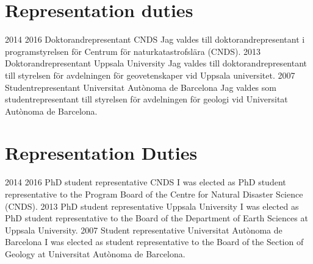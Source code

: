 \ifswedish
    \section{Representation duties}
    \position
        {2014 \textemdash{} 2016}
        {Doktorandrepresentant}
        {CNDS}
        {Jag valdes till doktorandrepresentant i programstyrelsen för Centrum för naturkatastrofslära (CNDS).}
    \position
        {2013}
        {Doktorandrepresentant}
        {Uppsala University}
        {Jag valdes till doktorandrepresentant till styrelsen för avdelningen för geovetenskaper vid Uppsala universitet.}
    \position
        {2007}
        {Studentrepresentant}
        {Universitat Autònoma de Barcelona}
        {Jag valdes som studentrepresentant till styrelsen för avdelningen för geologi vid Universitat Autònoma de Barcelona.}
\else
    \section{Representation Duties}
    \position
        {2014 \textemdash{} 2016}
        {PhD student representative}
        {CNDS}
        {I was elected as PhD student representative to the Program Board of the Centre for Natural Disaster Science (CNDS).}
    \position
        {2013}
        {PhD student representative}
        {Uppsala University}
        {I was elected as PhD student representative to the Board of the Department of Earth Sciences at Uppsala University.}
    \position
        {2007}
        {Student representative}
        {Universitat Autònoma de Barcelona}
        {I was elected as student representative to the Board of the Section of Geology at Universitat Autònoma de Barcelona.}
\fi
